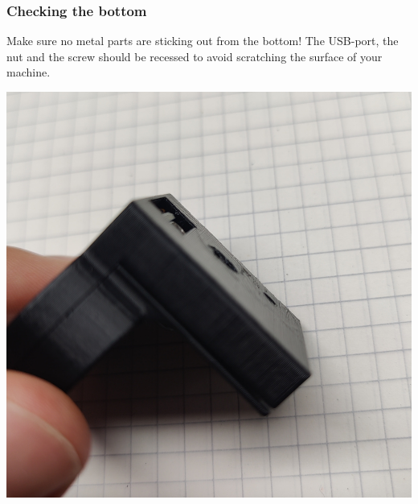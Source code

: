 \documentclass[]{article}
\begin{document}
\subsubsection{Checking the bottom}
\begin{minipage}[t]{0.5\linewidth}
	\vspace{0pt}
	Make sure no metal parts are sticking out from the bottom! The USB-port, the nut and the screw should be recessed to avoid scratching the surface of your machine.
\end{minipage}
\hfill
\begin{minipage}[t]{0.4\linewidth}
	\vspace{0pt}
	\includegraphics[width=\linewidth]{images/01_displayunit/20_check_bottom.jpg}
\end{minipage}
\end{document}
